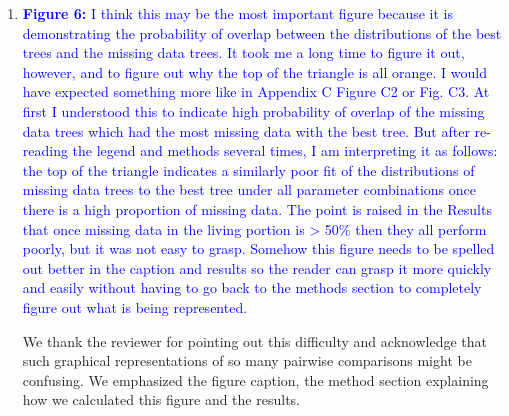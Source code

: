 \documentclass[12pt,letterpaper]{article}
\begin{document}
\begin{enumerate}

\item{\textcolor{blue}{\textbf{Figure 6:} I think this may be the most important figure because it is demonstrating the probability of overlap between the distributions of the best trees and the missing data trees.
It took me a long time to figure it out, however, and to figure out why the top of the triangle is all orange.
I would have expected something more like in Appendix C Figure C2 or Fig. C3.
At first I understood this to indicate high probability of overlap of the missing data trees which had the most missing data with the best tree.
But after re-reading the legend and methods several times, I am interpreting it as follows: the top of the triangle indicates a similarly poor fit of the distributions of missing data trees to the best tree under all parameter combinations once there is a high proportion of missing data.
The point is raised in the Results that once missing data in the living portion is > 50\% then they all perform poorly, but it was not easy to grasp.
Somehow this figure needs to be spelled out better in the caption and results so the reader can grasp it more quickly and easily without having to go back to the methods section to completely figure out what is being represented.}}

We thank the reviewer for pointing out this difficulty and acknowledge that such graphical representations of so many pairwise comparisons might be confusing.
We emphasized the figure caption, the method section explaining how we calculated this figure and the results.


\end{enumerate}
\end{document}
